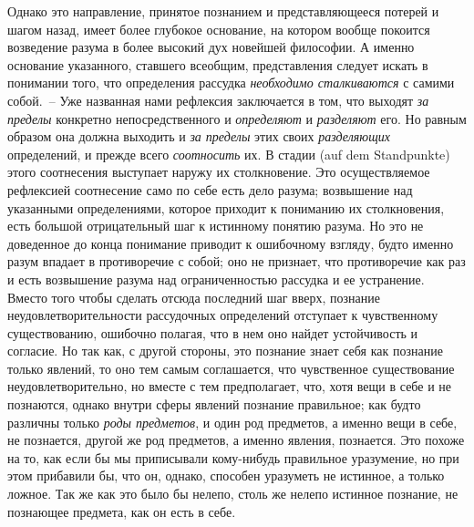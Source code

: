
Однако это направление, принятое познанием и представляющееся
потерей и шагом назад, имеет более глубокое
основание, на котором вообще покоится возведение
разума в более высокий дух новейшей философии. А
именно основание указанного, ставшего всеобщим, представления
следует искать в понимании того, что определения
рассудка \emph{необходимо сталкиваются} с самими собой.~--
Уже названная нами рефлексия заключается в
том, что выходят \emph{за пределы} конкретно непосредственного
и \emph{определяют} и \emph{разделяют} его. Но равным образом
она должна выходить и \emph{за пределы} этих своих \emph{разделяющих}
определений, и прежде всего \emph{соотносить} их.
В стадии (auf dem Standpunkte) этого соотнесения выступает
наружу их столкновение. Это осуществляемое
рефлексией соотнесение само по себе есть дело разума;
возвышение над указанными определениями, которое
приходит к пониманию их столкновения, есть большой
отрицательный шаг к истинному понятию разума. Но
это не доведенное до конца понимание приводит к ошибочному
взгляду, будто именно разум впадает в противоречие
с собой; оно не признает, что противоречие как
раз и есть возвышение разума над ограниченностью
рассудка и ее устранение. Вместо того чтобы сделать
отсюда последний шаг вверх, познание неудовлетворительности
рассудочных определений отступает к чувственному
существованию, ошибочно полагая, что в нем оно
найдет устойчивость и согласие. Но так как, с другой
стороны, это познание знает себя как познание только
явлений, то оно тем самым соглашается, что чувственное
существование неудовлетворительно, но вместе с тем
предполагает, что, хотя вещи в себе и не познаются,
однако внутри сферы явлений познание правильное; как
будто различны только \emph{роды предметов}, и один род предметов,
а именно вещи в себе, не познается, другой же
род предметов, а именно явления, познается. Это похоже
на то, как если бы мы приписывали кому-нибудь правильное
уразумение, но при этом прибавили бы, что он,
однако, способен уразуметь не истинное, а только ложное.
Так же как это было бы нелепо, столь же нелепо
истинное познание, не познающее предмета, как он есть
в себе.

